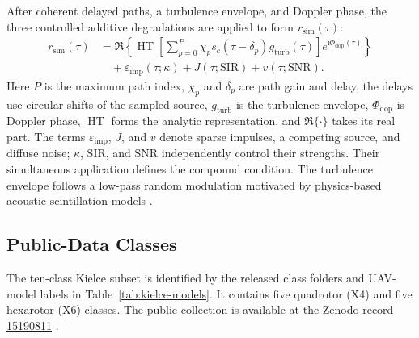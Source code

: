 After coherent delayed paths, a turbulence envelope, and Doppler phase, the three controlled additive degradations are applied to form $r_{\mathrm{sim}}(\tau)$:
\begin{align}
r_{\mathrm{sim}}(\tau)
&=\Re\!\left\{\operatorname{HT}\!\left[
\sum_{p=0}^{P}\chi_p s_c(\tau-\delta_p)
g_{\mathrm{turb}}(\tau)\right]e^{\mathrm i\Phi_{\mathrm{dop}}(\tau)}\right\}
\nonumber\\
&\quad+\varepsilon_{\mathrm{imp}}(\tau;\kappa)
+J(\tau;\mathrm{SIR})+v(\tau;\mathrm{SNR}).
\label{eq:degradation-app}
\end{align}
Here $P$ is the maximum path index, $\chi_p$ and $\delta_p$ are path gain and delay, the delays use circular shifts of the sampled source, $g_{\mathrm{turb}}$ is the turbulence envelope, $\Phi_{\mathrm{dop}}$ is Doppler phase, $\operatorname{HT}$ forms the analytic representation, and $\Re\{\cdot\}$ takes its real part. The terms $\varepsilon_{\mathrm{imp}}$, $J$, and $v$ denote sparse impulses, a competing source, and diffuse noise; $\kappa$, SIR, and SNR independently control their strengths. Their simultaneous application defines the compound condition. The turbulence envelope follows a low-pass random modulation motivated by physics-based acoustic scintillation models \citep{bresciani2023scintillation}.

\subsection{Public-Data Classes}
The ten-class Kielce subset is identified by the released class folders and UAV-model labels in Table~\ref{tab:kielce-models}. It contains five quadrotor (X4) and five hexarotor (X6) classes. The public collection is available at the \href{https://zenodo.org/records/15190811}{Zenodo record 15190811} \citep{miesikowska2023uavdataset}.

